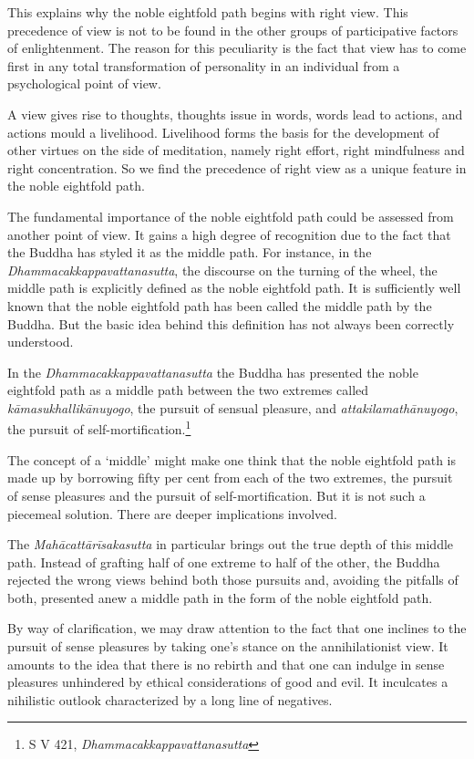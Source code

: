 This explains why the noble eightfold path begins with right view. This precedence of view is not to be found in the other groups of participative factors of enlightenment. The reason for this peculiarity is the fact that view has to come first in any total transformation of personality in an individual from a psychological point of view.

\enlargethispage{\baselineskip}

A view gives rise to thoughts, thoughts issue in words, words lead to actions, and actions mould a livelihood. Livelihood forms the basis for the development of other virtues on the side of meditation, namely right effort, right mindfulness and right concentration. So we find the precedence of right view as a unique feature in the noble eightfold path.

The fundamental importance of the noble eightfold path could be assessed from another point of view. It gains a high degree of recognition due to the fact that the Buddha has styled it as the middle path. For instance, in the \emph{Dhammacakkappavattanasutta}, the discourse on the turning of the wheel, the middle path is explicitly defined as the noble eightfold path. It is sufficiently well known that the noble eightfold path has been called the middle path by the Buddha. But the basic idea behind this definition has not always been correctly understood.

In the \emph{Dhammacakkappavattanasutta} the Buddha has presented the noble eightfold path as a middle path between the two extremes called \emph{kāmasukhallikānuyogo}, the pursuit of sensual pleasure, and \emph{attakilamathānuyogo}, the pursuit of self-mortification.\footnote{S V 421, \emph{Dhammacakkappavattanasutta}}

The concept of a `middle' might make one think that the noble eightfold path is made up by borrowing fifty per cent from each of the two extremes, the pursuit of sense pleasures and the pursuit of self-mortification. But it is not such a piecemeal solution. There are deeper implications involved.

The \emph{Mahācattārīsakasutta} in particular brings out the true depth of this middle path. Instead of grafting half of one extreme to half of the other, the Buddha rejected the wrong views behind both those pursuits and, avoiding the pitfalls of both, presented anew a middle path in the form of the noble eightfold path.

By way of clarification, we may draw attention to the fact that one inclines to the pursuit of sense pleasures by taking one's stance on the annihilationist view. It amounts to the idea that there is no rebirth and that one can indulge in sense pleasures unhindered by ethical considerations of good and evil. It inculcates a nihilistic outlook characterized by a long line of negatives.


